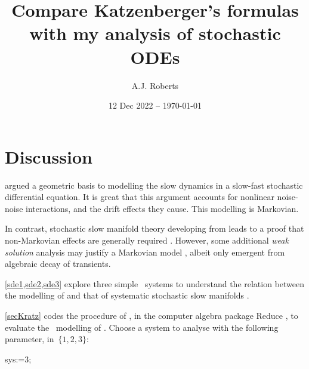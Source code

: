 \documentclass[11pt,a5paper]{article}
\title{Compare Katzenberger's formulas with my analysis of stochastic ODEs}
\author{A.J. Roberts}
\date{12 Dec 2022 -- \today}
\numberwithin{equation}{section}
\begin{document}
\maketitle

\tableofcontents

\section*{Discussion}

\cite{Katzenberger91} argued a geometric basis to modelling the slow dynamics in a slow-fast stochastic differential equation.
It is great that this argument accounts for nonlinear noise-noise interactions, and the drift effects they cause.
This modelling is Markovian.

In contrast, stochastic slow manifold theory developing from \cite{Boxler89} leads to a proof that non-Markovian effects are generally required \cite[]{Chao95, Roberts06k}.  
However, some additional \emph{weak solution} analysis may justify a Markovian model \cite[]{Chao95, Roberts05c}, albeit only emergent from algebraic decay of transients.

\cref{sde1,sde2,sde3} explore three simple \sde\ systems to understand the relation between the modelling of \cite{Katzenberger91} and that of systematic stochastic slow manifolds \cite[]{Roberts06k, Roberts09c}.

\cref{secKratz} codes the procedure of \cite{Parsons2015, Parsons2017}, in the computer algebra  package Reduce \cite[]{ReduceManual}, to evaluate the \sde\ modelling of \cite{Katzenberger91}.
Choose a system to analyse with the following parameter, in~\(\{1,2,3\}\):
\begin{reduce}
sys:=3;
\end{reduce}
\end{document}
